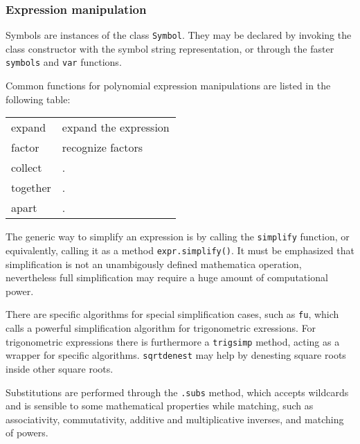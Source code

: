 
\subsubsection{Expression manipulation}


Symbols are instances of the class \texttt{Symbol}.
They may be declared by invoking the class constructor with the symbol string
representation, or through the faster \texttt{symbols} and \texttt{var}
functions.



Common functions for polynomial expression manipulations are listed in the
following table:
\begin{tabular}{l|p{0.7\linewidth}}
expand & expand the expression \\
factor & recognize factors \\
collect & . \\
together & . \\
apart & . \\
\end{tabular}


The generic way to simplify an expression is by calling the \texttt{simplify}
function, or equivalently, calling it as a method \texttt{expr.simplify()}.
It must be emphasized that simplification is not an unambigously defined
mathematica operation, nevertheless full simplification may require a huge
amount of computational power.

There are specific algorithms for special simplification cases,
such as \texttt{fu}, which calls a powerful simplification algorithm for
trigonometric exressions\cite{Fu et al.}.
For trigonometric expressions there is furthermore a \texttt{trigsimp} method,
acting as a wrapper for specific algorithms.
\texttt{sqrtdenest} may help by denesting square roots inside other square roots.



Substitutions are performed through the \texttt{.subs} method, which accepts
wildcards and is sensible to some mathematical properties while matching,
such as associativity, commutativity,  additive and multiplicative inverses,
and matching of powers.

